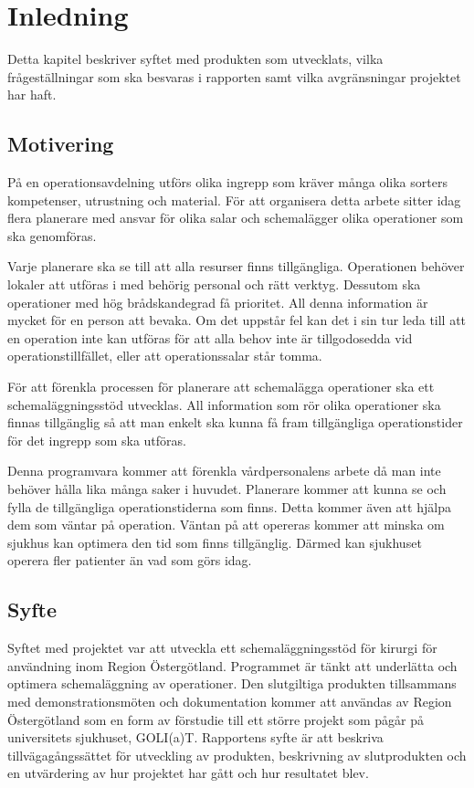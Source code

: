 \chapter{Inledning}
Detta kapitel beskriver syftet med produkten som utvecklats, vilka frågeställningar som ska besvaras i rapporten samt vilka avgränsningar projektet har haft.

\section{Motivering}
På en operationsavdelning utförs olika ingrepp som kräver många olika sorters kompetenser, utrustning och material. 
För att organisera detta arbete sitter
idag flera planerare med ansvar för olika salar och schemalägger olika operationer som ska genomföras. 

Varje planerare ska se till att alla resurser finns tillgängliga. Operationen behöver lokaler att utföras i med behörig personal och rätt verktyg. Dessutom ska operationer med hög brådskandegrad få prioritet. All denna information är
mycket för en person att bevaka. Om det uppstår fel kan det i sin tur leda till att en operation inte kan utföras för att alla behov inte är tillgodosedda vid operationstillfället,
eller att operationssalar står tomma.

För att förenkla processen för planerare att schemalägga operationer ska ett schemaläggningsstöd utvecklas. All information som rör olika operationer ska finnas
tillgänglig så att man enkelt ska kunna få fram tillgängliga operationstider för det ingrepp som ska utföras. 

Denna programvara kommer att förenkla  vårdpersonalens arbete då man inte behöver hålla lika många saker i huvudet. Planerare kommer att kunna se och fylla de tillgängliga operationstiderna som finns.
Detta kommer även att hjälpa dem som väntar på operation. Väntan på att opereras kommer att minska om sjukhus kan optimera den tid som finns tillgänglig. Därmed kan sjukhuset operera fler patienter än vad som görs idag.

\section{Syfte}\label{sec:syfte}
Syftet med projektet var att utveckla ett schemaläggningsstöd för kirurgi för användning inom Region Östergötland. Programmet är tänkt att underlätta och optimera schemaläggning av operationer. Den slutgiltiga produkten tillsammans med demonstrationsmöten och dokumentation kommer att användas av Region Östergötland som en form av förstudie till ett större projekt som pågår på universitets sjukhuset, GOLI(a)T. \cite{goliat} Rapportens syfte är att beskriva tillvägagångssättet för utveckling av produkten, beskrivning av slutprodukten och en utvärdering av hur projektet har gått och hur resultatet blev.

